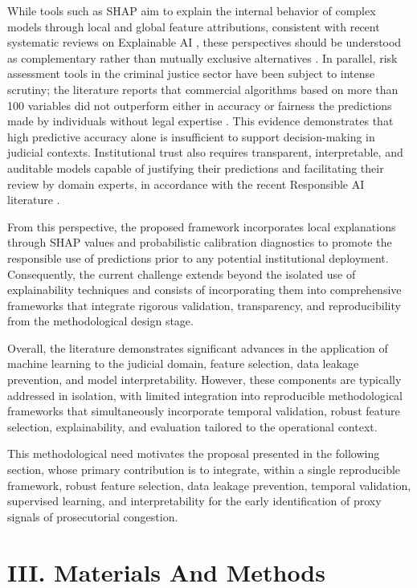 \documentclass[
  number]{elsarticle}
\begin{document}
While tools such as SHAP aim to explain the internal behavior of complex
models through local and global feature attributions, consistent with
recent systematic reviews on Explainable AI \citep{saarela_recent_2024},
these perspectives should be understood as complementary rather than
mutually exclusive alternatives
\citep{lundberg_unified_2017, bhatnagar_hybrid_2025}. In parallel, risk
assessment tools in the criminal justice sector have been subject to
intense scrutiny; the literature reports that commercial algorithms
based on more than 100 variables did not outperform either in accuracy
or fairness the predictions made by individuals without legal expertise
\citep{dressel_accuracy_2018}. This evidence demonstrates that high
predictive accuracy alone is insufficient to support decision-making in
judicial contexts. Institutional trust also requires transparent,
interpretable, and auditable models capable of justifying their
predictions and facilitating their review by domain experts, in
accordance with the recent Responsible AI literature
\citep{taylor_is_2025}.

From this perspective, the proposed framework incorporates local
explanations through SHAP values and probabilistic calibration
diagnostics to promote the responsible use of predictions prior to any
potential institutional deployment. Consequently, the current challenge
extends beyond the isolated use of explainability techniques and
consists of incorporating them into comprehensive frameworks that
integrate rigorous validation, transparency, and reproducibility from
the methodological design stage.

Overall, the literature demonstrates significant advances in the
application of machine learning to the judicial domain, feature
selection, data leakage prevention, and model interpretability. However,
these components are typically addressed in isolation, with limited
integration into reproducible methodological frameworks that
simultaneously incorporate temporal validation, robust feature
selection, explainability, and evaluation tailored to the operational
context.

This methodological need motivates the proposal presented in the
following section, whose primary contribution is to integrate, within a
single reproducible framework, robust feature selection, data leakage
prevention, temporal validation, supervised learning, and
interpretability for the early identification of proxy signals of
prosecutorial congestion.

\section{III. Materials And Methods}\label{iii.-materials-and-methods}
\end{document}
